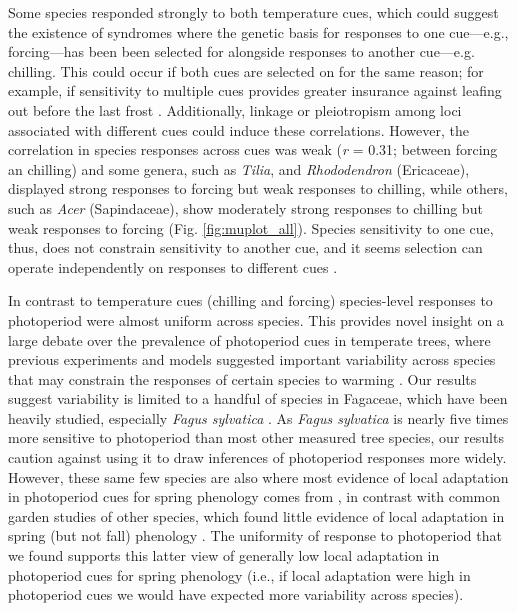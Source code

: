 \documentclass[11pt]{article}
\begin{document}
Some species responded strongly to both temperature cues, which could suggest the existence of syndromes where the genetic basis for responses to one cue---e.g., forcing---has been been selected for alongside responses to another cue---e.g. chilling. This could occur if both cues are selected on for the same reason; for example, if sensitivity to multiple cues provides greater insurance against leafing out before the last frost \citep{bonamour2019,memegan2021}. Additionally, linkage or pleiotropism among loci associated with different cues \citep{nakagawa2005} could induce these correlations. However, the correlation in species responses across cues was weak (\emph{r} = 0.31; between forcing an chilling) and some genera, such as \emph{Tilia}, and \emph{Rhododendron} (Ericaceae), displayed strong responses to forcing but weak responses to chilling, while others, such as \emph{Acer} (Sapindaceae), show moderately strong responses to chilling but weak responses to forcing (Fig. \ref{fig:muplot_all}). Species sensitivity to one cue, thus, does not constrain sensitivity to another cue, and it seems selection can operate independently on responses to different cues \citep{bonamour2019}.

In contrast to temperature cues (chilling and forcing) species-level responses to photoperiod were almost uniform across species. This provides novel insight on a large debate over the prevalence of photoperiod cues in temperate trees, where previous experiments \citep{Basler:2012,zohner2016} and models \citep[e.g.,][]{Hunter:1992jw,schaber20203} suggested important variability across species that may constrain the responses of certain species to warming \citep{way2015}. Our results suggest variability is limited to a handful of species in Fagaceae, which have been heavily studied, especially \emph{Fagus sylvatica} \citep[e.g.,][]{Basler:2012,zohner2016,kramer2017}. As \emph{Fagus sylvatica} is nearly five times more sensitive to photoperiod than most other measured tree species, our results caution against using it to draw inferences of photoperiod responses more widely. However, these same few species are also where most evidence of local adaptation in photoperiod cues for spring phenology comes from \citep[e.g.,][]{kramer2017}, in contrast with common garden studies of other species, which found little evidence of local adaptation in spring (but not fall) phenology \citep{aitken2016}. The uniformity of response to photoperiod that we found supports this latter view of generally low local adaptation in photoperiod cues for spring phenology (i.e., if local adaptation were high in photoperiod cues we would have expected more variability across species). 
\end{document}
